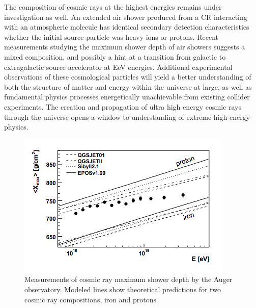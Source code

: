 	The composition of cosmic rays at the highest energies remains under investigation as well.  An extended air shower produced from a CR interacting with an atmospheric molecule has identical secondary detection characteristics whether the initial source particle was heavy ions or protons.  Recent measurements studying the maximum shower depth of air showers suggests a mixed composition, and possibly a hint at a transition from galactic to extragalactic source accelerator at EeV energies.\cite{AugerXmax}\cite{AugerXmaxDiscussion} Additional experimental observations of these cosmological particles will yield a better understanding of both the structure of matter and energy within the universe at large, as well as fundamental physics processes energetically unachievable from existing collider experiments.  The creation and propagation of ultra high energy cosmic rays through the universe opens a window to understanding of extreme high energy physics.

		
\noindent
\begin{figure}
\centering
	\includegraphics[width=\textwidth]{figures/AugerXmax}
	\caption{Measurements of cosmic ray maximum shower depth by the Auger observatory.  Modeled lines show theoretical predictions for two cosmic ray compositions, iron and protons\cite{AugerXmax}}
	\label{fig:AugerXmax}
\end{figure}

